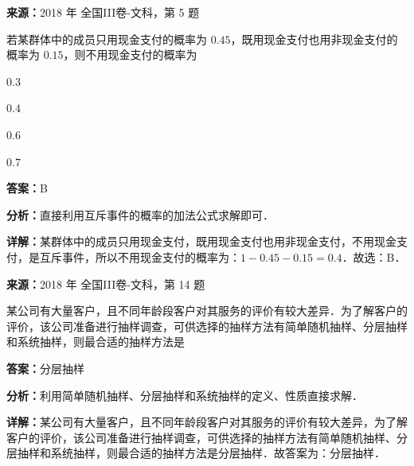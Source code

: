 \begin{question}[points=5]
\textbf{来源：}2018 年 全国III卷-文科，第 5 题\par
若某群体中的成员只用现金支付的概率为 $0.45$，既用现金支付也用非现金支付的概率为 $0.15$，则不用现金支付的概率为
\begin{choices}
  \item $0.3$
  \item $0.4$
  \item $0.6$
  \item $0.7$
\end{choices}
\begin{solution}
\textbf{答案：}B

\textbf{分析：}直接利用互斥事件的概率的加法公式求解即可．

\textbf{详解：}某群体中的成员只用现金支付，既用现金支付也用非现金支付，不用现金支付，是互斥事件，所以不用现金支付的概率为：$1-0.45-0.15=0.4$．故选：B．
\end{solution}
\end{question}

\begin{question}[points=5]
\textbf{来源：}2018 年 全国III卷-文科，第 14 题\par
某公司有大量客户，且不同年龄段客户对其服务的评价有较大差异．为了解客户的评价，该公司准备进行抽样调查，可供选择的抽样方法有简单随机抽样、分层抽样和系统抽样，则最合适的抽样方法是
\fillin[{$分层抽样$}]
\begin{solution}
\textbf{答案：}$分层抽样$

\textbf{分析：}利用简单随机抽样、分层抽样和系统抽样的定义、性质直接求解．

\textbf{详解：}某公司有大量客户，且不同年龄段客户对其服务的评价有较大差异，为了解客户的评价，该公司准备进行抽样调查，可供选择的抽样方法有简单随机抽样、分层抽样和系统抽样，则最合适的抽样方法是分层抽样．故答案为：分层抽样．
\end{solution}
\end{question}

